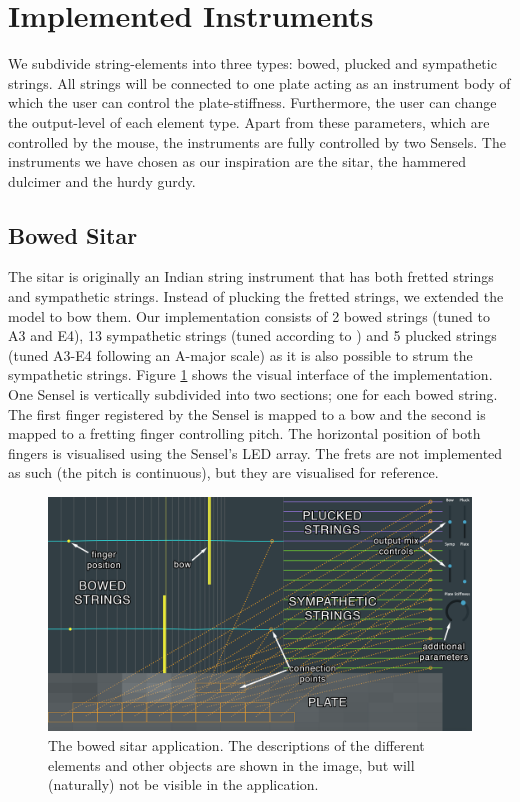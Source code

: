 \documentclass{article}
\begin{document}
\section{Implemented Instruments}
We subdivide string-elements into three types: bowed, plucked and sympathetic strings. All strings will be connected to one plate acting as an instrument body of which the user can control the plate-stiffness. Furthermore, the user can change the output-level of each element type. Apart from these parameters, which are controlled by the mouse, the instruments are fully controlled by two Sensels. The instruments we have chosen as our inspiration are the sitar, the hammered dulcimer and the hurdy gurdy.

\subsection{Bowed Sitar}
The sitar is originally an Indian string instrument that has both fretted strings and sympathetic strings. Instead of plucking the fretted strings, we extended the model to bow them. Our implementation consists of 2 bowed strings (tuned to A3 and E4), 13 sympathetic strings (tuned according to \cite{sitarTuning}) and 5 plucked strings (tuned A3-E4 following an A-major scale) as it is also possible to strum the sympathetic strings. Figure \ref{fig:bowedSitar} shows the visual interface of the implementation. One Sensel is vertically subdivided into two sections; one for each bowed string. The first finger registered by the Sensel is mapped to a bow and the second is mapped to a fretting finger controlling pitch. The horizontal position of both fingers is visualised using the Sensel's LED array. The frets are not implemented as such (the pitch is continuous), but they are visualised for reference. 


\begin{figure}[h]
\centering
\includegraphics[width=1.5\columnwidth]{BowedSitar.png}
\caption{The bowed sitar application. The descriptions of the different elements and other objects are shown in the image, but will (naturally) not be visible in the application. \label{fig:bowedSitar}}
\end{figure}
\end{document}
